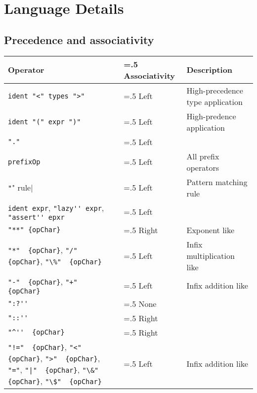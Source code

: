 \chapter{Language Details}
\label{chap:details}
\section{Precedence and associativity}
\begin{table}
  \centering
  \begin{tabularx}{\linewidth}{|>{\hsize=1\hsize\raggedright\arraybackslash}X|>{\hsize=.5\hsize}X|>{\hsize=1.5\hsize}X|}
    \hline
    Operator & Associativity & Description\\
    \hline
    \lstinline[language=ebnf]|ident "<" types ">"| & Left & High-precedence type application\\
    \hline
    \lstinline[language=ebnf]|ident "(" expr ")"| & Left & High-predence application\\
    \hline
    \lstinline[language=ebnf]|"."| & Left & \\
    \hline
    \lstinline[language=ebnf]|prefixOp| & Left & All prefix operators\\
    \hline
    \lstinline[language=ebnf]|"|" rule| & Left & Pattern matching rule\\
    \hline
    \mbox{\lstinline[language=ebnf]|ident expr|,} \mbox{\lstinline[language=ebnf]|"lazy'' expr|,} \mbox{\lstinline[language=ebnf]|"assert'' epxr|} & Left & \\
    \hline
    \lstinline[language=ebnf]|"**" {opChar}| & Right & Exponent like\\
    \hline
    \mbox{\lstinline[language=ebnf]|"*"  {opChar}|,} \mbox{\lstinline[language=ebnf]|"/"  {opChar}|,} \mbox{\lstinline[language=ebnf]|"\%"  {opChar}|} & Left & Infix multiplication like\\
     \hline
    \mbox{\lstinline[language=ebnf]|"-"  {opChar}|,} \mbox{\lstinline[language=ebnf]|"+"  {opChar}|} & Left & Infix addition like\\
     \hline
     \lstinline[language=ebnf]|":?''| & None & \\
     \hline
     \lstinline[language=ebnf]|"::''| & Right & \\
     \hline
     \lstinline[language=ebnf]|"^''  {opChar}| & Right & \\
     \hline
    \mbox{\lstinline[language=ebnf]|"!="  {opChar}|,} \mbox{\lstinline[language=ebnf]|"<"  {opChar}|,} \mbox{\lstinline[language=ebnf]|">"  {opChar}|,} \mbox{\lstinline[language=ebnf]|"="|,} \mbox{\lstinline[language=ebnf]!"|"  {opChar}!,} \mbox{\lstinline[language=ebnf]|"\&"  {opChar}|,} \mbox{\lstinline[language=ebnf]|"\$"  {opChar}|} & Left & Infix addition like\\

\end{tabularx}
\end{table}
